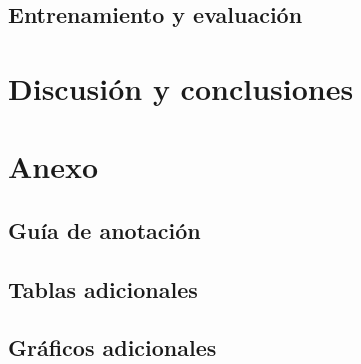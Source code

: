 \documentclass[colorinlistoftodos]{article}
\begin{document}
\subsection{Entrenamiento y evaluaci\'on}\label{subsection-results-models}


\section{Discusi\'on y conclusiones}\label{section-discussion}


\newpage



\clearpage
\appendix
\section{Anexo}\label{appendix}

\subsection{Gu\'ia de anotaci\'on}\label{appendix-annotation}


\subsection{Tablas adicionales}\label{appendix-tables}


\subsection{Gr\'aficos adicionales}\label{appendix-plots}

\end{document}
